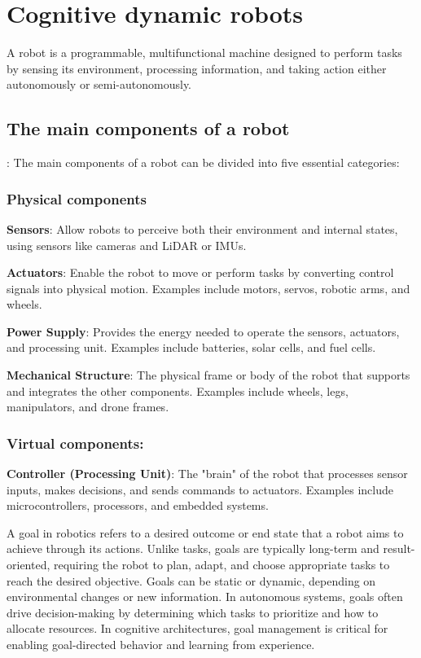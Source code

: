     \chapter{Cognitive dynamic robots}
A robot is a programmable, multifunctional machine designed to perform tasks by sensing its environment, processing information, and taking action either autonomously or semi-autonomously. \cite{siciliano-2016-springer-handbook-robotics}

\section{The main components of a robot}:
The main components of a robot can be divided into five essential categories:

    \subsection{Physical components}
        \textbf{Sensors}: Allow robots to perceive both their environment and internal states, using sensors like cameras and LiDAR or IMUs.
        
        \textbf{Actuators}: Enable the robot to move or perform tasks by converting control signals into physical motion.
        Examples include motors, servos, robotic arms, and wheels.
    
        \textbf{Power Supply}: Provides the energy needed to operate the sensors, actuators, and processing unit.
        Examples include batteries, solar cells, and fuel cells.
    
        \textbf{Mechanical Structure}: The physical frame or body of the robot that supports and integrates the other components.
        Examples include wheels, legs, manipulators, and drone frames.

    \subsection{Virtual components:}
        \textbf{Controller (Processing Unit)}: The "brain" of the robot that processes sensor inputs, makes decisions, and sends commands to actuators.
        Examples include microcontrollers, processors, and embedded systems.

         A goal in robotics refers to a desired outcome or end state that a robot aims to achieve through its actions. Unlike tasks, goals are typically long-term and result-oriented, requiring the robot to plan, adapt, and choose appropriate tasks to reach the desired objective. Goals can be static or dynamic, depending on environmental changes or new information. In autonomous systems, goals often drive decision-making by determining which tasks to prioritize and how to allocate resources. In cognitive architectures, goal management is critical for enabling goal-directed behavior and learning from experience.
        \cite{scassellati-2001-goal-directed-behavior-in-robotics}
        
